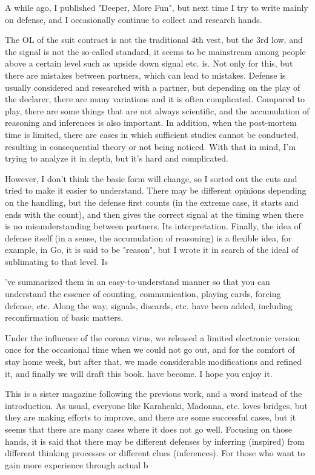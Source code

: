 
A while ago, I published "Deeper, More Fun", but next time I try to write mainly on defense, and I occasionally continue to collect and research hands.



The OL of the suit contract is not the traditional 4th vest, but the 3rd low, and the signal is not the so-called standard, it seems to be mainstream among people above a certain level such as upside down signal etc. is. Not only for this, but there are mistakes between partners, which can lead to mistakes. Defense is usually considered and researched with a partner, but depending on the play of the declarer, there are many variations and it is often complicated. Compared to play, there are some things that are not always scientific, and the accumulation of reasoning and inferences is also important. In addition, when the post-mortem time is limited, there are cases in which sufficient studies cannot be conducted, resulting in consequential theory or not being noticed. With that in mind, I'm trying to analyze it in depth, but it's hard and complicated.




However, I don't think the basic form will change, so I sorted out the cuts and tried to make it easier to understand. There may be different opinions depending on the handling, but the defense first counts (in the extreme case, it starts and ends with the count), and then gives the correct signal at the timing when there is no misunderstanding between partners. Its interpretation. Finally, the idea of defense itself (in a sense, the accumulation of reasoning) is a flexible idea, for example, in Go, it is said to be "reason", but I wrote it in search of the ideal of sublimating to that level. Is


've summarized them in an easy-to-understand manner so that you can understand the essence of counting, communication, playing cards, forcing defense, etc. Along the way, signals, discards, etc. have been added, including reconfirmation of basic matters.


Under the influence of the corona virus, we released a limited electronic version once for the occasional time when we could not go out, and for the comfort of stay home week, but after that, we made considerable modifications and refined it, and finally we will draft this book. have become. I hope you enjoy it.



This is a sister magazine following the previous work, and a word instead of the introduction. As usual, everyone like Karahenki, Madonna, etc. loves bridges, but they are making efforts to improve, and there are some successful cases, but it seems that there are many cases where it does not go well. Focusing on those hands, it is said that there may be different defenses by inferring (inspired) from different thinking processes or different clues (inferences).
For those who want to gain more experience through actual b

